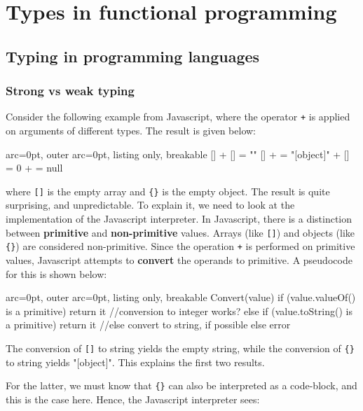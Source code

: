 \section*{ Types in functional programming }

\subsection*{ Typing in programming languages }

\subsubsection*{ Strong vs weak typing }

Consider the following example from Javascript, where the operator \texttt{+} is applied on arguments of different types. The result is given below:

\begin{tcblisting}{ arc=0pt, outer arc=0pt, listing only, breakable}
[] + []  =  ""  
[] + {}  = "[object]"
{} + []  = 0
{} + {}  = null

\end{tcblisting}
 

where \texttt{[]} is the empty array and \texttt{\{\}} is the empty object. The result is quite surprising, and unpredictable. To explain it, we need to look at the implementation of the Javascript interpreter. In Javascript, there is a distinction between \textbf{primitive} and \textbf{non-primitive} values. Arrays (like \texttt{[]}) and objects (like \texttt{\{\}}) are considered non-primitive. Since the operation \texttt{+} is performed on primitive values, Javascript attempts to \textbf{convert} the operands to primitive. A pseudocode for this is shown below:

\begin{tcblisting}{ arc=0pt, outer arc=0pt, listing only, breakable}
     Convert(value) {
        if (value.valueOf() is a primitive) return it          //conversion to integer works?
        else if (value.toString() is a primitive) return it    //else convert to string, if possible 
             else error
     }

\end{tcblisting}


The conversion of \texttt{[]} to string yields the empty string, while the conversion of \texttt{\{\}} to string yields "[object]". This explains the first two results.

For the latter, we must know that \texttt{\{\}} can also be interpreted as a code-block, and this is the case here. Hence, the Javascript interpreter sees:

